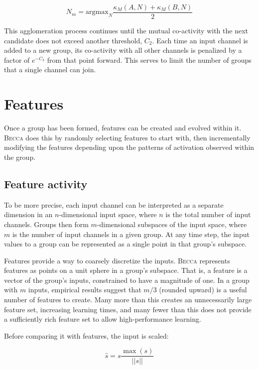 \begin{equation}
N_m = \mbox{argmax}_{N}  \frac{\kappa_M(A,N) + \kappa_M(B, N)}{ 2}
\end{equation}

This agglomeration process continues until the mutual co-activity with the next candidate does not exceed another threshold, $C_2$.
Each time an input channel is added to a new group, its co-activity with all other channels is penalized by a factor of $e^{-C_3}$ from that point forward. This serves to limit the number of groups that a single channel can join. 

\section{Features}
Once a group has been formed, features can be created and evolved within it. \textsc{Becca} does this by randomly selecting features to start with, then incrementally modifying the features depending upon the patterns of activation observed within the group.

\subsection{Feature activity}

To be more precise, each input channel can be interpreted as a separate dimension in an $n$-dimensional input space, where $n$ is the total number of input channels. Groups then form $m$-dimensional subspaces of the input space, where $m$ is the number of input channels in a given group. At any time step, the input values to a group can be represented as a single point in that group's subspace. 

Features provide a way to coarsely discretize the inputs. \textsc{Becca} represents features as points on a unit sphere in a group's subspace. That is, a feature is a vector of the group's inputs, constrained to have a magnitude of one. In a group with $m$ inputs, empirical results suggest that $m/3$ (rounded upward) is a useful number of features to create. Many more than this creates an unnecessarily large feature set, increasing learning times, and many fewer than this does not provide a sufficiently rich feature set to allow high-performance learning. 

Before comparing it with features, the input is scaled:

\begin{equation}
\hat{s} = s  \frac{\max(s)} {|| s ||}
\end{equation}
 
